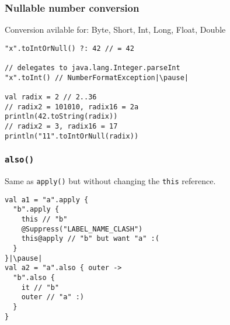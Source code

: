 
	

\begin{frame}[fragile] \frametitle{Nullable number conversion}
Conversion avilable for: Byte, Short, Int, Long, Float, Double
\begin{lstlisting}
"x".toIntOrNull() ?: 42 // = 42

// delegates to java.lang.Integer.parseInt
"x".toInt() // NumberFormatException|\pause|

val radix = 2 // 2..36
// radix2 = 101010, radix16 = 2a
println(42.toString(radix))
// radix2 = 3, radix16 = 17
println("11".toIntOrNull(radix))
\end{lstlisting}
\end{frame}


\begin{frame}[fragile] \frametitle{\texttt{also()}}
Same as \texttt{apply()} but without changing the \texttt{this} reference.
\begin{lstlisting}
val a1 = "a".apply {
  "b".apply {
    this // "b"
    @Suppress("LABEL_NAME_CLASH")
    this@apply // "b" but want "a" :(
  }
}|\pause|
val a2 = "a".also { outer ->
  "b".also {
    it // "b"
    outer // "a" :)
  }
}
\end{lstlisting}
\end{frame}

